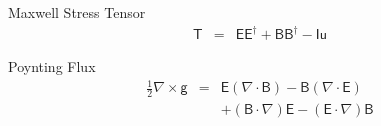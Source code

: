 \documentclass[aps,twocolumn,secnumarabic,nobalancelastpage,amsmath,amssymb,
amsthm,nofootinbib,parskip=full]{revtex4}
\numberwithin{equation}{section}
\newcommand{\qv}[1]{\mathbf{\mathsf{#1}}}
\begin{document}
Maxwell Stress Tensor
\begin{equation*}
\begin{array}{rcl}
  \qv{T}&=&\qv{E}\qv{E}^\dagger+\qv{B}\qv{B}^\dagger-\qv{I}\mathsf{u}
\end{array}
\end{equation*}

Poynting Flux
\begin{equation*}
\begin{array}{rcl}
\frac{1}{2}\nabla\times\mathsf{g}&=&
           \qv{E}\left(\nabla\cdot\qv{B}\right)
           -\qv{B}\left(\nabla\cdot\qv{E}\right) \\[3pt]
         &&+\left(\qv{B}\cdot\nabla\right)\qv{E}
           -\left(\qv{E}\cdot\nabla\right)\qv{B}
\end{array}
\end{equation*}
\end{document}
